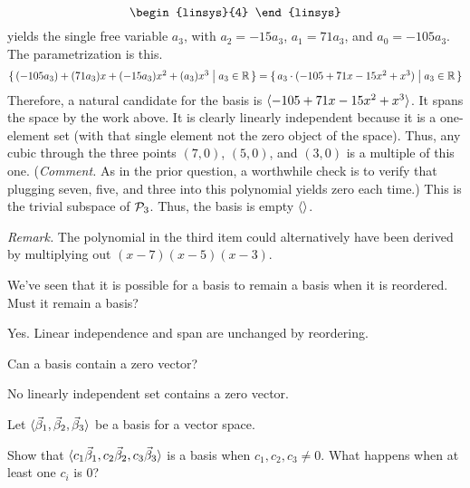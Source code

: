 \begin{exercises}
\begin{answer}
\begin{exparts}
\begin{equation*}
\begin{linsys}{4}
            \end{linsys}
          \end{equation*}
          yields the single free variable $a_3$, with 
          $a_2=-15a_3$, $a_1=71a_3$, and $a_0=-105a_3$.
          The parametrization is this.
          \begin{equation*} 
            \mbox{$\{\,(-105a_3)+(71a_3)x+(-15a_3)x^2+(a_3)x^3\bigm| a_3\in\mathbb{R}\,\}$}=
            \mbox{$\{\,a_3\cdot(-105+71x-15x^2+x^3)\bigm| a_3\in\mathbb{R}\,\}$}
          \end{equation*}
          Therefore, a natural candidate for the basis is 
          $\langle-105+71x-15x^2+x^3\rangle$.
          It spans the space by the work above.
          It is clearly linearly independent because it is a one-element
          set (with that single element not the zero object of the space).
          Thus, any cubic through the three points $(7,0)$, $(5,0)$, and
          $(3,0)$ is a multiple of this one.
          (\textit{Comment.}
          As in the prior question, 
          a worthwhile check is to verify that plugging seven, five, and
          three into this polynomial yields zero each time.)
        \partsitem This is the trivial subspace of $\mathcal{P}_3$.
          Thus, the  basis is empty $\langle\rangle$.
      \end{exparts}
      \noindent\textit{Remark.}
      The polynomial in the third item could alternatively have been derived
      by multiplying out $(x-7)(x-5)(x-3)$.
     \end{answer}
  \item 
     We've seen that it is possible for a basis to remain a basis when
     it is reordered.
     Must it remain a basis? 
     \begin{answer}
       Yes.
       Linear independence and span are unchanged by reordering.
     \end{answer}
  \item  
    Can a basis contain a zero vector?
    \begin{answer}
      No linearly independent set contains a zero vector.  
    \end{answer}
  \recommended \item
    Let \( \langle\vec{\beta}_1,\vec{\beta}_2,\vec{\beta}_3\rangle \)
    be a basis for a vector space.
    \begin{exparts}
      \partsitem Show that 
        \( \langle c_1\vec{\beta}_1,c_2\vec{\beta}_2,c_3\vec{\beta}_3\rangle \)
        is a basis when \( c_1, c_2, c_3\neq 0 \).
        What happens when at least one \( c_i \) is $0$?

\end{exparts}
\end{exercises}
